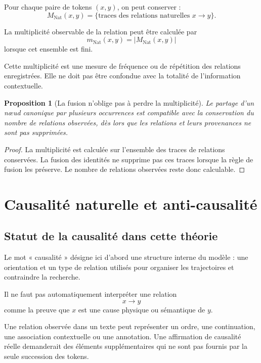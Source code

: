 \documentclass[11pt,a4paper]{report}
\theoremstyle{definition}
\theoremstyle{plain}
\newtheorem{proposition}[definition]{Proposition}
\theoremstyle{remark}
\begin{document}
Pour chaque paire de tokens \((x,y)\), on peut conserver :
\[
M_{\mathrm{Nat}}(x,y)
=
\{\text{traces des relations naturelles }x\to y\}.
\]

La multiplicité observable de la relation peut être calculée par
\[
m_{\mathrm{Nat}}(x,y)
=
|M_{\mathrm{Nat}}(x,y)|
\]
lorsque cet ensemble est fini.

Cette multiplicité est une mesure de fréquence ou de répétition
des relations enregistrées. Elle ne doit pas être confondue avec
la totalité de l'information contextuelle.

\begin{proposition}[La fusion n'oblige pas à perdre la multiplicité]
Le partage d'un nœud canonique par plusieurs occurrences est
compatible avec la conservation du nombre de relations observées,
dès lors que les relations et leurs provenances ne sont pas
supprimées.
\end{proposition}

\begin{proof}
La multiplicité est calculée sur l'ensemble des traces de
relations conservées. La fusion des identités ne supprime pas
ces traces lorsque la règle de fusion les préserve. Le nombre
de relations observées reste donc calculable.
\end{proof}

\chapter{Causalité naturelle et anti-causalité}

\section{Statut de la causalité dans cette théorie}

Le mot « causalité » désigne ici d'abord une structure interne
du modèle : une orientation et un type de relation utilisés pour
organiser les trajectoires et contraindre la recherche.

Il ne faut pas automatiquement interpréter une relation
\[
x\to y
\]
comme la preuve que \(x\) est une cause physique ou sémantique
de \(y\).

Une relation observée dans un texte peut représenter un ordre,
une continuation, une association contextuelle ou une annotation.
Une affirmation de causalité réelle demanderait des éléments
supplémentaires qui ne sont pas fournis par la seule succession
des tokens.
\end{document}
